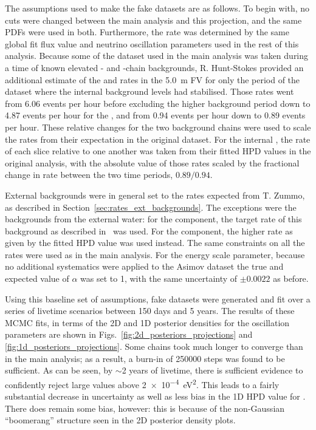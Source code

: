The assumptions used to make the fake datasets are as follows. To begin with, no cuts were changed between the main analysis and this projection, and the same PDFs were used in both. Furthermore, the \beight{} rate was determined by the same global fit flux value and neutrino oscillation parameters used in the rest of this analysis. Because some of the dataset used in the main analysis was taken during a time of known elevated - and -chain backgrounds, R. Hunt-Stokes provided an additional estimate of the  and  rates in the \SI{5.0}{\metre} FV for only the period of the dataset where the internal background levels had stabilised. Those rates went from 6.06 events per hour before excluding the higher background period down to 4.87 events per hour for the , and from 0.94 events per hour down to 0.89 events per hour. These relative changes for the two background chains were used to scale the rates from their expectation in the original dataset. For the internal , the rate of each slice relative to one another was taken from their fitted HPD values in the original analysis, with the absolute value of those rates scaled by the fractional change in rate between the two time periods, $0.89/0.94$.

External backgrounds were in general set to the rates expected from T. Zummo, as described in Section~\ref{sec:rates_ext_backgrounds}. The exceptions were the backgrounds from the external water: for the  component, the target rate of this background as described in~\cite{andringaCurrentStatusFuture2016} was used. For the  component, the higher rate as given by the fitted HPD value was used instead. The same constraints on all the rates were used as in the main analysis. For the energy scale parameter, because no additional systematics were applied to the Asimov dataset the true and expected value of $\alpha$ was set to 1, with the same uncertainty of $\pm0.0022$ as before.

Using this baseline set of assumptions, fake datasets were generated and fit over a series of livetime scenarios between 150 days and 5 years. The results of these MCMC fits, in terms of the 2D and 1D posterior densities for the oscillation parameters are shown in Figs.~\ref{fig:2d_posteriors_projections} and \ref{fig:1d_posteriors_projections}. Some chains took much longer to converge than in the main analysis; as a result, a burn-in of \num{250000} steps was found to be sufficient. As can be seen, by $\sim$2 years of livetime, there is sufficient evidence to confidently reject large \dmsq{} values above \SI{2e-4}{\eV\squared}. This leads to a fairly substantial decrease in uncertainty as well as less bias in the 1D HPD value for \tonetwo{}. There does remain some bias, however: this is because of the non-Gaussian ``boomerang'' structure seen in the 2D posterior density plots.

